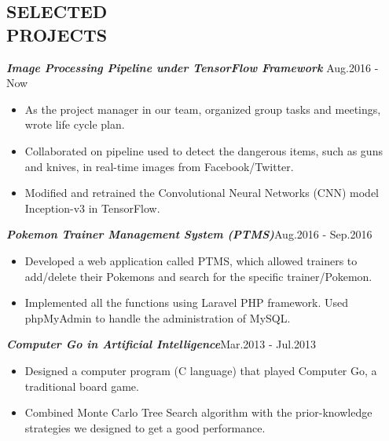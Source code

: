 \documentclass[line,margin]{res}
\begin{document}
\begin{resume}
\section{SELECTED \\ PROJECTS}
           {\sl \textbf{Image Processing Pipeline under TensorFlow Framework}}           \hfill Aug.2016 - Now \\[1mm]
             \vspace{-5mm}
             \begin{itemize}
             \item As the project manager in our team, organized group tasks and meetings, wrote life cycle plan.
             \vspace{-1mm}
             \item Collaborated on pipeline used to detect the dangerous items, such as guns and knives, in real-time images from Facebook/Twitter.
             \vspace{-1mm}
             \item Modified and retrained the Convolutional Neural Networks (CNN) model Inception-v3 in TensorFlow.
             \end{itemize}
             \vspace{-3mm}
            {\sl \textbf{Pokemon Trainer Management System (PTMS)}}\hfill Aug.2016 - Sep.2016 \\[1mm]
            \vspace{-5mm}
             \begin{itemize}
             \item Developed a web application called PTMS, which allowed trainers to add/delete their Pokemons and search for the specific trainer/Pokemon.
             \vspace{-1mm}
             \item Implemented all the functions using Laravel PHP framework. Used phpMyAdmin to handle the administration of MySQL.
             \end{itemize}
             \vspace{-3mm}
            {\sl \textbf{Computer Go in Artificial Intelligence}}\hfill Mar.2013 - Jul.2013 \\[1mm]
            \vspace{-5mm}
            \begin{itemize}
            \item Designed a computer program (C language) that played Computer Go, a traditional board game.
            \vspace{-1mm}
            \item Combined Monte Carlo Tree Search algorithm with the prior-knowledge strategies we designed to get a good performance.
            \end{itemize}
\vspace{-2.5mm}

\end{resume}
\end{document}

